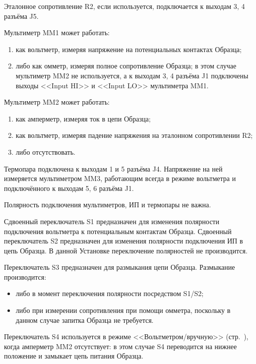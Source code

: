 \documentclass[12pt, a4paper, twocolumn]{report}
\begin{document}
Эталонное сопротивление R2, если используется, подключается к выходам 3, 4 разъёма J5.

Мультиметр MM1 может работать:

\begin{enumerate}
\item как вольтметр, измеряя напряжение на потенциальных контактах Образца;
\item либо как омметр, измеряя полное сопротивление Образца; в этом случае мультиметр MM2 не используется, а к выходам 3, 4 разъёма J1 подключены выходы <<Input HI>> и <<Input LO>> мультиметра MM1.
\end{enumerate}

Мультиметр MM2 может работать:

\begin{enumerate}
\item как амперметр, измеряя ток в цепи Образца;
\item как вольтметр, измеряя падение напряжения на эталонном сопротивлении R2;
\item либо отсутствовать.
\end{enumerate}

Термопара подключена к выходам 1 и 5 разъёма J4. Напряжение на ней измеряется мультиметром MM3, работающим всегда в режиме вольтметра и подключённого к выходам 5, 6 разъёма J1.

Полярность подключения мультиметров, ИП и термопары не важна.

Сдвоенный переключатель S1 предназначен для изменения полярности подключения вольтметра к потенциальным контактам Образца. Сдвоенный переключатель S2 предназначен для изменения полярности подключения ИП в цепь Образца. В данной Установке переключение полярностей не производится.

Переключатель S3 предназначен для размыкания цепи Образца. Размыкание производится:

\begin{itemize}
\item либо в момент переключения полярности посредством S1/S2;
\item либо при измерении сопротивления при помощи омметра, поскольку в данном случае запитка Образца не требуется.
\end{itemize}

Переключатель S4 используется в режиме <<Вольтметром/вручную>> (стр.~\pageref{sec_voltmeter_manually}), когда амперметр MM2 отсутствует: в этом случае S4 переводится на нижнее положение и замыкает цепь питания Образца.
\end{document}
